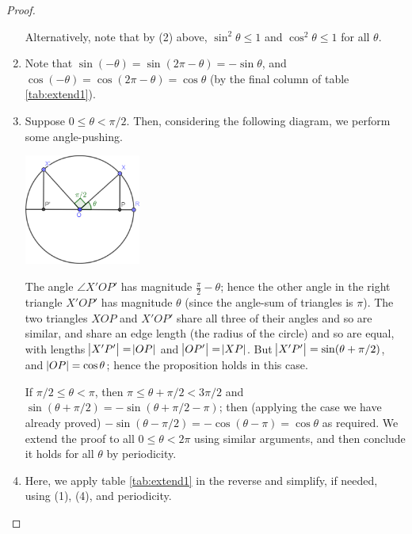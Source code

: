 \documentclass[a4paper,leqno]{article}
\numberwithin{equation}{section}
\theoremstyle{definition}
\theoremstyle{remark}
\begin{document}
\begin{proof}
\begin{enumerate}
          Alternatively, note that by (2) above, $ \sin^2 \theta \leq 1 $ and $ \cos^2 \theta \leq 1 $ for all $ \theta $.
    \item Note that $ \sin(-\theta) = \sin(2\pi - \theta) = -\sin \theta $, and $ \cos(-\theta) = \cos(2\pi - \theta) = \cos \theta $ (by
          the final column of table \ref{tab:extend1}).
    \item Suppose $ 0 \leq \theta < \pi/2 $. Then, considering the following diagram, we perform some angle-pushing.
          \begin{center}
            \includegraphics[width=0.3\textwidth]{shifting}
          \end{center}
          The angle $ \angle X'OP' $ has magnitude $ \frac{\pi}{2} - \theta $; hence the other angle in the right
          triangle $ X'OP' $ has magnitude $ \theta $ (since the angle-sum of triangles is $ \pi $). The two triangles
          $ XOP $ and $ X'OP' $ share all three of their angles and so are similar, and share an edge length (the radius
          of the circle) and so are equal, with lengths $ \abs{X'P'} = \abs{OP} $ and $ \abs{OP'} = \abs{XP} $. But $ \abs{X'P'} = \sin(\theta + \pi/2) $,
          and $ \abs{OP} = \cos \theta $; hence the proposition holds in this case.

          If $ \pi/2 \leq \theta < \pi $, then $ \pi \leq \theta + \pi/2 < 3\pi/2 $ and $ \sin(\theta + \pi/2) = -\sin(\theta + \pi/2 - \pi) $;
          then (applying the case we have already proved) $ -\sin(\theta - \pi/2) = -\cos(\theta - \pi) = \cos \theta $ as required. We extend
          the proof to all $ 0 \leq \theta < 2\pi $ using similar arguments, and then conclude it holds for all $ \theta $ by periodicity.
    \item Here, we apply table \ref{tab:extend1} in the reverse and simplify, if needed, using (1), (4), and periodicity.
  \end{enumerate}
\end{proof}
\end{document}
